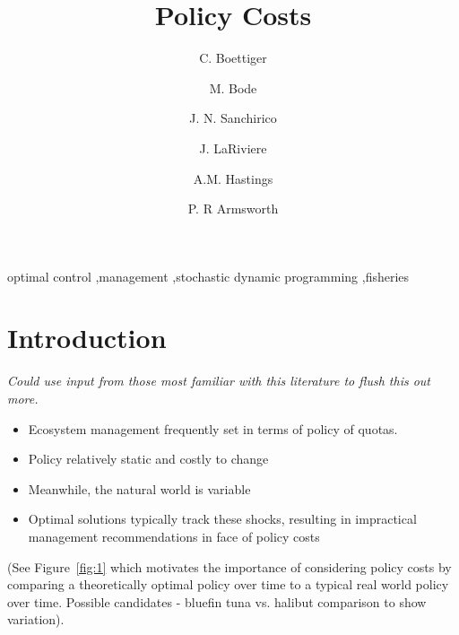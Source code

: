 \documentclass[authoryear, review, 12pt]{elsarticle}
\begin{document}
\begin{frontmatter}
\title{Policy Costs }
\author[cpb]{C. Boettiger}
\author[melbourne]{M. Bode}
\author[esp]{J. N. Sanchirico}
\author[utk-econ]{J. LaRiviere}
\author[cpb,esp]{A.M. Hastings}
\author[utk-eeb]{P. R Armsworth}
\address[cpb]{Center for Population Biology, University of California, Davis, California 95616, USA}
\address[melbourne]{Australian Research Council Centre of Excellence for Environmental Decisions, University of Melbourne, School of Botany,
Parkville, Melbourne, VIC 3010, Australia}
\address[esp]{Department of Environmental Science \& Policy, University of California, Davis, CA 95616, USA}
\address[utk-econ]{Department of Economics, University of Tennessee, Knoxville, TN 37996, USA}
\address[utk-eeb]{Department of Ecology and Evolutionary Biology, University of Tennessee, Knoxville, TN 37996, USA}


\begin{abstract}
\end{abstract}
\begin{keyword}
  optimal control \sep management \sep stochastic dynamic programming \sep fisheries 
\end{keyword}

\end{frontmatter}

\section{Introduction}


\emph{Could use input from those most familiar with this literature to flush this out more.}

\begin{itemize}
  \item Ecosystem management frequently set in terms of policy of quotas. 
  \item Policy relatively static and costly to change
  \item Meanwhile, the natural world is variable
  \item Optimal solutions typically track these shocks, resulting in impractical management recommendations in face of policy costs
\end{itemize}

(See Figure~\ref{fig:1} which motivates the importance of considering policy costs by comparing a theoretically optimal policy over time to a typical real world policy over time. Possible candidates - bluefin tuna vs. halibut comparison to show variation).  
\end{document}
